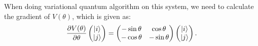 When doing variational quantum algorithm on this system, we need to calculate the gradient of $V(\theta)$, which is given as:
\begin{equation}
    \frac{\partial V(\theta)}{\partial\theta}\begin{pmatrix}
        \ket{i} \\\ket{j}
    \end{pmatrix}=\begin{pmatrix}
        -\sin\theta & \cos\theta  \\
        -\cos\theta & -\sin\theta
    \end{pmatrix}\begin{pmatrix}
        \ket{i} \\\ket{j}
    \end{pmatrix}.
\end{equation}
